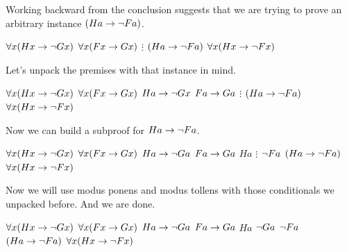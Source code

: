 Working backward from the conclusion suggests that we are trying to prove an
arbitrary instance $(Ha\rightarrow\neg Fa)$.

\begin{fitchproof}
   {$\forall x(Hx\rightarrow\neg Gx)$}   
   {$\forall x(Fx\rightarrow Gx)$}         
   {$\vdots$}
   {$(Ha\rightarrow\neg Fa )$}
   {$\forall x(Hx\rightarrow\neg Fx )$}  
\end{fitchproof}

Let's unpack the premises with that instance in mind.

\begin{fitchproof}
   {$\forall x(Hx\rightarrow\neg Gx)$}   
   {$\forall x(Fx\rightarrow Gx)$}         
   {$Ha\rightarrow\neg Gx$}               
   {$Fa\rightarrow Ga$}                    
   {$\vdots$}
   {$(Ha\rightarrow\neg Fa )$}
   {$\forall x(Hx\rightarrow\neg Fx )$}  
\end{fitchproof}

Now we can build a subproof for $Ha\rightarrow\neg Fa$.

\begin{fitchproof}
   {$\forall x(Hx\rightarrow\neg Gx)$}   
   {$\forall x(Fx\rightarrow Gx)$}         
   {$Ha\rightarrow\neg Ga$}               
   {$Fa\rightarrow Ga$}                    
  \open
   {$Ha$}                           
   {$\vdots$}
   {$\neg Fa$}
  \close
   {$(Ha\rightarrow\neg Fa )$}            
   {$\forall x(Hx\rightarrow\neg Fx )$}  
\end{fitchproof}

Now we will use modus ponens and modus tollens with those conditionals we
unpacked before. And we are done.

\begin{fitchproof}
   {$\forall x(Hx\rightarrow\neg Gx)$}   
   {$\forall x(Fx\rightarrow Gx)$}         
   {$Ha\rightarrow\neg Ga$}               
   {$Fa\rightarrow Ga$}                    
  \open
   {$Ha$}                           
   {$\neg Ga$}                     
   {$\neg Fa$}                     
  \close
   {$(Ha\rightarrow\neg Fa )$}            
   {$\forall x(Hx\rightarrow\neg Fx )$}  
\end{fitchproof}

